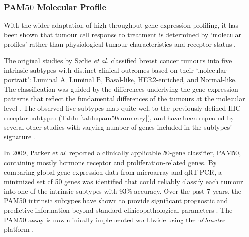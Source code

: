     
    
    
    
    
    
    
            
 
            
    \subsubsection{PAM50 Molecular Profile} \label{section:pam50}
    

With the wider adaptation of high-throughput gene expression profiling, it has been shown that tumour cell response to treatment is determined by ‘molecular profiles’ rather than physiological tumour characteristics and receptor status \cite{Weigelt2010}. 

The original studies by Sørlie \textit{et al.} \cite{Srlie2001GeneImplications} classified breast cancer tumours into five intrinsic subtypes with distinct clinical outcomes based on their ‘molecular portrait’: Luminal A, Luminal B, Basal-like, HER2-enriched, and Normal-like. The classification was guided by the differences underlying the gene expression patterns that reflect the fundamental differences of the tumours at the molecular level \cite{Srlie2003RepeatedSets}. The observed five subtypes map quite well to the previously defined IHC receptor subtypes (Table  \ref{table:pam50summary}), and have been repeated by several other studies with varying number of genes included in the subtypes’ signature \cite{Dai2015}. 

In 2009, Parker \textit{et al. }\cite{ParkerSupervisedSubtypes} reported a clinically applicable 50-gene classifier, PAM50, containing mostly hormone receptor and proliferation-related genes. By comparing global gene expression data from microarray and qRT-PCR, a minimized set of 50 genes was identified that could reliably classify each tumour into one of the intrinsic subtypes with 93\% accuracy. Over the past 7 years, the PAM50 intrinsic subtypes have shown to provide significant prognostic and predictive information beyond standard clinicopathological parameters \cite{GnantPredictingAlone, Vidal2017}. The PAM50 assay is now clinically implemented worldwide using the \textit{nCounter} platform \cite{Vidal2017}.

